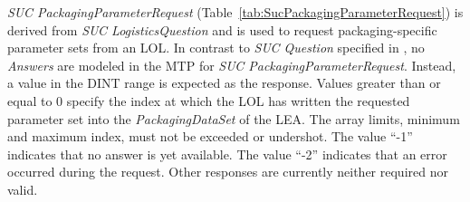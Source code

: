 \emph{SUC PackagingParameterRequest} (Table~\ref{tab:SucPackagingParameterRequest}) is derived from \emph{SUC LogisticsQuestion} and is used to request packaging-specific parameter sets from an LOL. In contrast to \emph{SUC Question} specified in \cite{PNO.2025.Part4}, no \emph{Answers} are modeled in the MTP for \emph{SUC PackagingParameterRequest}. Instead, a value in the DINT range is expected as the response. Values greater than or equal to 0 specify the index at which the LOL has written the requested parameter set into the \emph{PackagingDataSet} of the LEA. The array limits, minimum and maximum index, must not be exceeded or undershot. The value \enquote{-1} indicates that no answer is yet available. The value \enquote{-2} indicates that an error occurred during the request. Other responses are currently neither required nor valid.

